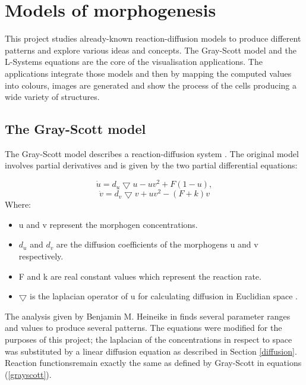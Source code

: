 \chapter{Models of morphogenesis}
\label{morphogenesis}

This project studies already-known reaction-diffusion models to produce different patterns and explore various ideas and concepts. The Gray-Scott model and the L-Systems equations are the core of the visualisation applications. The applications integrate those models and then by mapping the computed values into colours, images are generated and show the process of the cells producing a wide variety of structures.

\section{The Gray-Scott model}
The Gray-Scott model describes a reaction-diffusion system \cite{mcgough_pattern_2004}. The original model involves partial derivatives and is given by the two partial differential equations:

$$\dot{u} = d_u\bigtriangledown u - uv^2 + F(1-u),$$
\begin{equation}
\label{grayscott}
\dot{v} = d_v\bigtriangledown v + uv^2 - (F+k)v
\end{equation}
Where:
\begin{itemize}
\item u and v represent the morphogen concentrations.

\item $ d_u $ and $ d_v $ are the diffusion coefficients of the morphogens u and v respectively.

\item F and k are real constant values which represent the reaction rate.

\item $\bigtriangledown$ is the laplacian operator of u for calculating diffusion in Euclidian space \cite{heineike_modeling_2002}.
\end{itemize}


The analysis given by Benjamin M. Heineike in \cite{heineike_modeling_2002} finds several parameter ranges and values to produce several patterns. The equations were modified for the purposes of this project; the laplacian of the concentrations in respect to space was substituted by a linear diffusion equation as described in Section \ref{diffusion}. Reaction functionsremain exactly the same as defined by Gray-Scott in equations (\ref{grayscott}).

